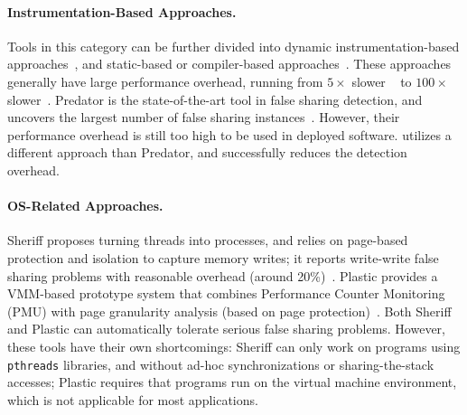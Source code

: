 \paragraph{Instrumentation-Based Approaches.} Tools in this category can be further divided into dynamic instrumentation-based approaches~\cite{falseshare:binaryinstrumentation1, falseshare:binaryinstrumentation2, qinzhao}, and static-based or compiler-based approaches~\cite{Predator}.
These approaches generally have large performance overhead, running from $5\times$ slower ~\cite{qinzhao, Predator} to $100\times$ slower~\cite{falseshare:binaryinstrumentation1, falseshare:binaryinstrumentation2}. Predator is the state-of-the-art tool in false sharing detection, and uncovers the largest number of false sharing instances~\cite{Predator}. However, their performance overhead is still too high to be used in deployed software. \cheetah{} utilizes a different approach than Predator, and successfully reduces the detection overhead. 


\paragraph{OS-Related Approaches.} Sheriff proposes turning threads into processes, and relies on page-based protection and isolation to capture memory writes; it reports write-write false sharing problems with reasonable overhead (around 20\%)~\cite{Sheriff}. Plastic provides a VMM-based prototype system that combines Performance Counter Monitoring (PMU) with page granularity analysis (based on page protection)~\cite{OSdetection}. Both Sheriff and Plastic can automatically tolerate serious false sharing problems. However, these tools have their own shortcomings: Sheriff can only work on programs using \texttt{pthreads} libraries, and without ad-hoc synchronizations or sharing-the-stack accesses; Plastic requires that programs run on the virtual machine environment, which is not applicable for most applications.   

